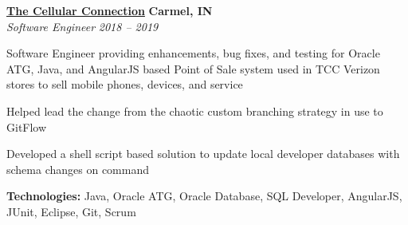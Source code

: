 %
    \headerrow
        {\textbf{\href{https://www.tccrocks.com/}{The Cellular Connection}}}
        {\textbf{Carmel, IN}}
    \\
    \headerrow
        {\emph{Software Engineer}}
        {\emph{2018 -- 2019}}
    \begin{itemize*}
        \item Software Engineer providing enhancements, bug fixes, and testing for Oracle ATG, Java,
            and AngularJS based Point of Sale system used in TCC Verizon stores to sell mobile phones, devices, and service
        \item Helped lead the change from the chaotic custom branching strategy in use to GitFlow
        \item Developed a shell script based solution to update local developer databases with schema changes on command
    \end{itemize*}

    \hspace{1.0em}
        {\textbf{Technologies:} Java, Oracle ATG, Oracle Database, SQL Developer, AngularJS, JUnit, Eclipse, Git, Scrum}

